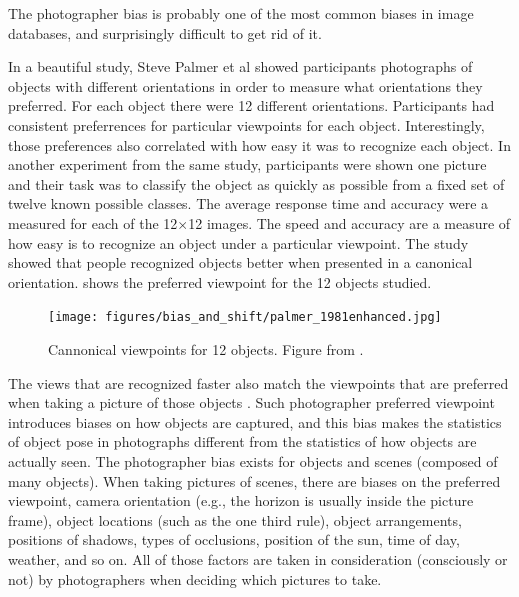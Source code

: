 The photographer bias is probably one of the most common biases in image databases, and surprisingly difficult to get rid of it. 

In a beautiful study,  Steve Palmer et al \cite{Palmer1981}
 showed participants photographs of objects with different orientations in order to measure what orientations they preferred. For each object there were 12 different orientations. Participants had consistent preferrences for particular viewpoints for each object. Interestingly, those preferences also correlated with how easy it was to recognize each object. In another experiment from the same study, participants were shown one picture and their task was to classify the object as quickly as possible from a fixed set of twelve known possible classes. The average response time and accuracy were a measured for each of the 12$\times$12 images. The speed and accuracy are a measure of how easy is to recognize an object under a particular viewpoint. The study showed that people recognized objects better when presented in a canonical orientation. \Fig{\ref{fig:bias_and_shift:palmer_1981enhanced}} shows the preferred viewpoint for the 12 objects studied.


\begin{figure}[h!]
    \centerline{
    \texttt{[image: figures/bias\_and\_shift/palmer\_1981enhanced.jpg]}
    }
    \caption{Cannonical viewpoints for 12 objects. Figure from \cite{Palmer1981}.}
    \label{fig:bias_and_shift:palmer_1981enhanced}
\end{figure}

The views that are recognized faster also match the viewpoints that are preferred when taking a picture of those objects \cite{Palmer1981}. Such photographer preferred viewpoint introduces biases on how objects are captured, and this bias makes the statistics of object pose in photographs different from the statistics of how objects are actually seen. The photographer bias exists for objects and scenes (composed of many objects). When taking pictures of scenes, there are biases on the preferred viewpoint, camera orientation (e.g., the horizon is usually inside the picture frame), object locations (such as the one third rule), object arrangements, positions of shadows, types of occlusions, position of the sun, time of day, weather, and so on. All of those factors are taken in consideration (consciously or not) by photographers when deciding which pictures to take.

